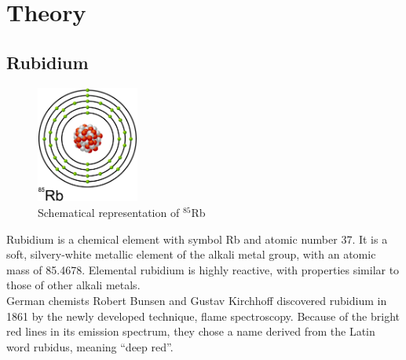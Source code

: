 
\chapter{Theory}  %
\pagebreak

\ifpdf{}
    \graphicspath{{Chapter1/Figs/Raster/}{Chapter1/Figs/PDF/}{Chapter1/Figs/}}
\else
    \graphicspath{{Chapter1/Figs/Vector/}{Chapter1/Figs/}}
\fi


\section{Rubidium} %

\begin{figure}[h]
\centering
\includegraphics[width=0.3\textwidth]{rubidium_atom}
\caption[Rubidium Atom]{Schematical representation of \(^{85}\)Rb}
\label{fig:Atom}
\end{figure}

\vspace{\fill}

Rubidium is a chemical element with symbol Rb and atomic number 37.
It is a soft, silvery-white metallic element of the alkali metal group, 
with an atomic mass of 85.4678. Elemental rubidium is highly reactive, with 
properties similar to those of other alkali metals.\\


German chemists Robert Bunsen and Gustav Kirchhoff discovered rubidium in 
1861 by the newly developed technique, flame spectroscopy.
Because of the bright red lines in its emission spectrum, they chose a name 
derived from the Latin word rubidus, meaning ``deep red''. \citep{bunsen}\\

